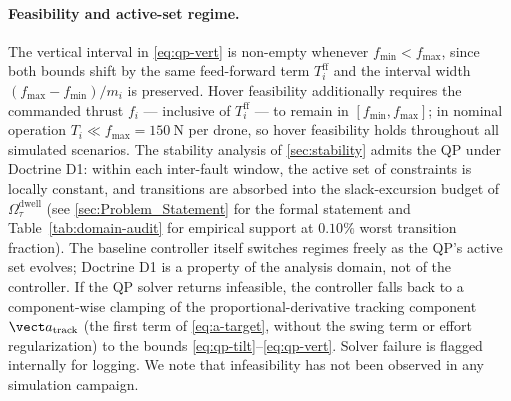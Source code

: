 \paragraph{Feasibility and active-set regime.} The vertical interval in \eqref{eq:qp-vert} is non-empty whenever $f_{\min} < f_{\max}$, since both bounds shift by the same feed-forward term $T_i^{\mathrm{ff}}$ and the interval width $(f_{\max} - f_{\min})/m_i$ is preserved. Hover feasibility additionally requires the commanded thrust $f_i$ --- inclusive of $T_i^{\mathrm{ff}}$ --- to remain in $[f_{\min}, f_{\max}]$; in nominal operation $T_i \ll f_{\max} = \SI{150}{\newton}$ per drone, so hover feasibility holds throughout all simulated scenarios. The stability analysis of \cref{sec:stability} admits the QP under Doctrine D1: within each inter-fault window, the active set of constraints is locally constant, and transitions are absorbed into the slack-excursion budget of $\Omega_\tau^{\mathrm{dwell}}$ (see \cref{sec:Problem_Statement} for the formal statement and Table~\ref{tab:domain-audit} for empirical support at $0.10\%$ worst transition fraction). The baseline controller itself switches regimes freely as the QP's active set evolves; Doctrine D1 is a property of the analysis domain, not of the controller. If the QP solver returns infeasible, the controller falls back to a component-wise clamping of the proportional-derivative tracking component $\vect a_{\mathrm{track}}$ (the first term of \eqref{eq:a-target}, without the swing term or effort regularization) to the bounds \eqref{eq:qp-tilt}--\eqref{eq:qp-vert}. Solver failure is flagged internally for logging. We note that infeasibility has not been observed in any simulation campaign.

